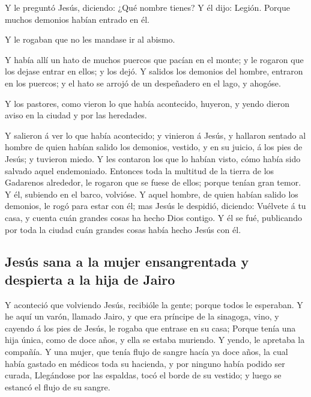  Y le preguntó Jesús, diciendo: ¿Qué nombre tienes? Y él
dijo: Legión. Porque muchos demonios habían entrado en él.

 Y le rogaban que no les mandase ir al abismo.

 Y había allí un hato de muchos puercos que pacían en el
monte; y le rogaron que los dejase entrar en ellos; y los dejó.
 Y salidos los demonios del hombre, entraron en los
puercos; y el hato se arrojó de un despeñadero en el lago, y ahogóse.

 Y los pastores, como vieron lo que había acontecido,
huyeron, y yendo dieron aviso en la ciudad y por las heredades.

 Y salieron á ver lo que había acontecido; y vinieron á
Jesús, y hallaron sentado al hombre de quien habían salido los demonios,
vestido, y en su juicio, á los pies de Jesús; y tuvieron miedo.
 Y les contaron los que lo habían visto, cómo había sido
salvado aquel endemoniado.  Entonces toda la multitud de
la tierra de los Gadarenos alrededor, le rogaron que se fuese de ellos;
porque tenían gran temor. Y él, subiendo en el barco, volvióse.
 Y aquel hombre, de quien habían salido los demonios, le
rogó para estar con él; mas Jesús le despidió, diciendo: 
Vuélvete á tu casa, y cuenta cuán grandes cosas ha hecho Dios contigo. Y
él se fué, publicando por toda la ciudad cuán grandes cosas había hecho
Jesús con él.

\hypertarget{jesuxfas-sana-a-la-mujer-ensangrentada-y-despierta-a-la-hija-de-jairo}{%
\subsection{Jesús sana a la mujer ensangrentada y despierta a la hija de
Jairo}\label{jesuxfas-sana-a-la-mujer-ensangrentada-y-despierta-a-la-hija-de-jairo}}

 Y aconteció que volviendo Jesús, recibióle la gente;
porque todos le esperaban.  Y he aquí un varón, llamado
Jairo, y que era príncipe de la sinagoga, vino, y cayendo á los pies de
Jesús, le rogaba que entrase en su casa;  Porque tenía
una hija única, como de doce años, y ella se estaba muriendo. Y yendo,
le apretaba la compañía.  Y una mujer, que tenía flujo de
sangre hacía ya doce años, la cual había gastado en médicos toda su
hacienda, y por ninguno había podido ser curada, 
Llegándose por las espaldas, tocó el borde de su vestido; y luego se
estancó el flujo de su sangre.

